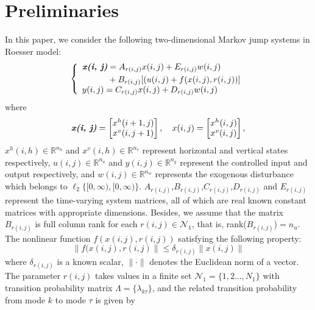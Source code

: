\documentclass[conference]{IEEEtran}
\begin{document}
\section{Preliminaries} \label{priliminaries}
	In this paper, we consider the following two-dimensional Markov jump systems in Roesser model:
	\begin{equation} \label{system-equation}
	\left\{
		\begin{array}{lr}
			\begin{split}
				\emph{\textbf{x(i, j)}} &= A_{r(i,j)}x(i,j)+E_{r(i,j)}w(i,j)\\
										&+B_{r(i,j)}[(u(i,j)+f(x(i,j),r(i,j))]
			\end{split}\\
			\begin{split}
				y(i,j) = C_{r(i,j)}x(i,j)+D_{r(i,j)}w(i,j)
			\end{split}
		\end{array}
	\right.
	\end{equation}
	where
	\begin{equation*}
		\emph{\textbf{x(i, j)}} = \begin{bmatrix}
			x^{h}(i+1,j)\\
			x^{v}(i,j+1)
		\end{bmatrix}, \quad 
		x(i, j) = \begin{bmatrix}
		x^{h}(i,j)\\
		x^{v}(i,j)
		\end{bmatrix},          
	\end{equation*}
	$x^{h}(i,h)\in \mathbb{R}^{n_h}$ and $x^{v}(i,h)\in \mathbb{R}^{n_v}$ represent horizontal and vertical states respectively, $u(i,j) \in \mathbb{R}^{n_u}$ and $y(i,j) \in \mathbb{R}^{n_y}$ represent the controlled input and output respectively, and $w(i,j) \in \mathbb{R}^{n_w}$ represents the exogenous disturbance which belongs to $\ell_{2}\{[0,\infty),[0,\infty)\}$. $A_{r(i,j)}$,$B_{r(i,j)}$,$C_{r(i,j)}$,$D_{r(i,j)}$ and $E_{r(i,j)}$ represent the time-varying system matrices, all of which are real known constant matrices with appropriate dimensions. Besides, we assume that the matrix $B_{r(i,j)}$ is full column rank for each $r(i,j)\in\mathcal{N}_{1}$, that is, rank($B_{r(i,j)}$)$=n_u$. The nonlinear function $f(x(i,j),r(i,j))$ satisfying the following property:
	\begin{equation}\label{nonlinear-func}
		\|f(x(i,j),r(i,j)\| \leq \delta_{r(i,j)}\|x(i,j)\|
	\end{equation}
	where $\delta_{r(i,j)}$ is a known scalar, $\|\cdot\|$ denotes the Euclidean norm of a vector. The parameter $r(i,j)$ takes values in a finite set $\mathcal{N}_{1}=\{1,2...,N_{1} \}$ with transition probability matrix $\varLambda = \{\lambda_{k\tau}\}$, and the related transition probability from mode $k$ to mode $\tau$ is given by 
\end{document}
